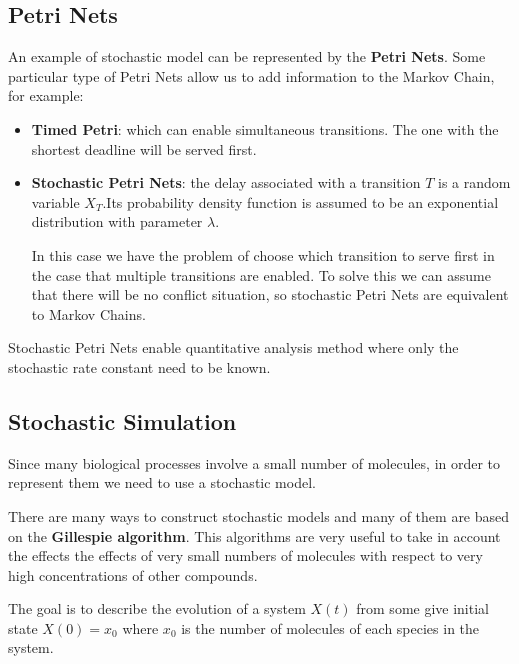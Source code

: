 \subsection{Petri Nets}
An example of stochastic model can be represented by the \textbf{Petri Nets}.
Some particular type of Petri Nets allow us to add information to the Markov
Chain, for example:
\begin{itemize}
    \item \textbf{Timed Petri}: which can enable simultaneous transitions. The
          one with the shortest deadline will be served first.
    \item \textbf{Stochastic Petri Nets}: the delay associated with a transition
          $T$ is a random variable $X_T$.Its probability density function is
          assumed to be an exponential distribution with parameter $\lambda$.

          In this case we have the problem of choose which transition to serve
          first in the case that multiple transitions are enabled. To solve this
          we can assume that there will be no conflict situation, so stochastic
          Petri Nets are equivalent to Markov Chains.
\end{itemize}

Stochastic Petri Nets enable quantitative analysis method where only the stochastic
rate constant need to be known.
\subsection{Stochastic Simulation}
Since many biological processes involve a small number of molecules, in order to
represent them we need to use a stochastic model.

There are many ways to construct stochastic models and many of them are based on
the \textbf{Gillespie algorithm}. This algorithms are very useful to take in
account the effects the effects of very small numbers of molecules with respect
to very high concentrations of other compounds.

The goal is to describe the evolution of a system $X(t)$ from some give initial
state $X(0) = x_0$ where $x_0$ is the number of molecules of each species in the
system.

